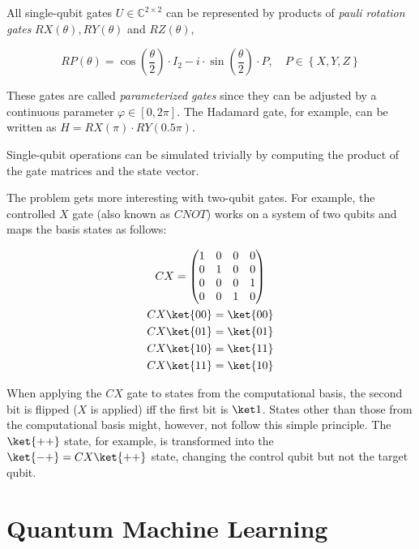 All single-qubit gates $U \in \mathbb{C}^{2 \times 2}$ can be represented by
products of \emph{pauli rotation gates} $RX(\theta), RY(\theta)$ and
$RZ(\theta)$,

\begin{equation}
    \label{eq:rotational-pauli-gates}
    RP\left(\theta\right) = \cos\left(\frac\theta2\right) \cdot I_2 - i \cdot \sin\left(\frac\theta2\right) \cdot P,\quad
    P \in \left\{X, Y, Z\right\}
\end{equation}

These gates are called \emph{parameterized gates} since they can be adjusted by a
continuous parameter $\varphi \in \left[0, 2\pi\right]$.
The Hadamard gate, for example, can be written as
$H = RX(\pi) \cdot RY(0.5\pi)$.

Single-qubit operations can be simulated trivially by computing the product of
the gate matrices and the state vector.

The problem gets more interesting with two-qubit gates.
For example, the controlled $X$ gate (also known as $CNOT$) works on a system
of two qubits and maps the basis states as follows:

\begin{gather}
    \label{eq:cx-zbasis}
    CX = \begin{pmatrix}
        1&0&0&0\\
        0&1&0&0\\
        0&0&0&1\\
        0&0&1&0
    \end{pmatrix}\\
    CX \ket{00} = \ket{00}\\
    CX \ket{01} = \ket{01}\\
    CX \ket{10} = \ket{11}\\
    CX \ket{11} = \ket{10}
\end{gather}

When applying the $CX$ gate to states from the computational basis, the second
bit is flipped ($X$ is applied) iff the first bit is $\ket 1$.
States other than those from the computational basis might, however, not follow
this simple principle.
The $\ket{++}$ state, for example, is transformed into the
$\ket{-+} = CX \ket{++}$ state, changing the control qubit but not the target
qubit.

\section{Quantum Machine Learning}
\label{sec:qml-intro}

